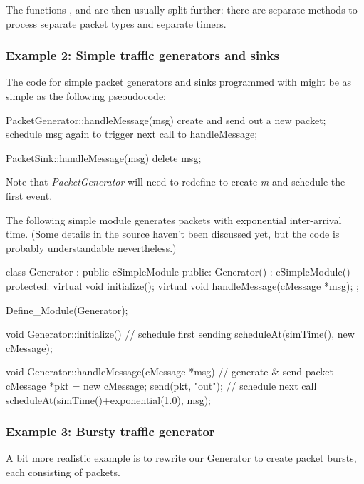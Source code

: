 The functions , 
and  are then usually split further: there are separate
methods to process separate packet types and separate timers.


\subsubsection{Example 2: Simple traffic generators and sinks}


The code for simple packet generators and sinks programmed with  might
be as simple as the following pseoudocode:

\begin{cpp}
PacketGenerator::handleMessage(msg)
{
    create and send out a new packet;
    schedule msg again to trigger next call to handleMessage;
}

PacketSink::handleMessage(msg)
{
    delete msg;
}
\end{cpp}

Note that \textit{PacketGenerator} will need to redefine 
to create \textit{m} and schedule the first event.

The following simple module generates packets with exponential
inter-arrival time. (Some details in the source haven't been
discussed yet, but the code is probably understandable nevertheless.)


\begin{cpp}
class Generator : public cSimpleModule
{
  public:
    Generator() : cSimpleModule() {}
  protected:
    virtual void initialize();
    virtual void handleMessage(cMessage *msg);
};

Define_Module(Generator);

void Generator::initialize()
{
    // schedule first sending
    scheduleAt(simTime(), new cMessage);
}

void Generator::handleMessage(cMessage *msg)
{
    // generate & send packet
    cMessage *pkt = new cMessage;
    send(pkt, "out");
    // schedule next call
    scheduleAt(simTime()+exponential(1.0), msg);
}
\end{cpp}



\subsubsection{Example 3: Bursty traffic generator}


A bit more realistic example is to rewrite our Generator to create
packet bursts, each consisting of  packets.

